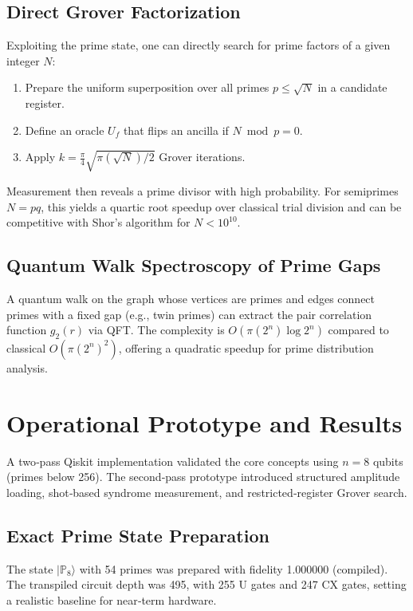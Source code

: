 \documentclass[12pt,a4paper]{article}
\begin{document}
\subsection{Direct Grover Factorization}
Exploiting the prime state, one can directly search for prime factors of a given integer \(N\):
\begin{enumerate}
    \item Prepare the uniform superposition over all primes \(p \le \sqrt{N}\) in a candidate register.
    \item Define an oracle \(U_f\) that flips an ancilla if \(N \bmod p = 0\).
    \item Apply \(k = \frac{\pi}{4}\sqrt{\pi(\sqrt{N})/2}\) Grover iterations.
\end{enumerate}
Measurement then reveals a prime divisor with high probability. For semiprimes \(N=pq\), this yields a quartic root speedup over classical trial division and can be competitive with Shor’s algorithm for \(N < 10^{10}\).

\subsection{Quantum Walk Spectroscopy of Prime Gaps}
A quantum walk on the graph whose vertices are primes and edges connect primes with a fixed gap (e.g., twin primes) can extract the pair correlation function \(g_2(r)\) via QFT. The complexity is \(O(\pi(2^n)\log 2^n)\) compared to classical \(O(\pi(2^n)^2)\), offering a quadratic speedup for prime distribution analysis.

\section{Operational Prototype and Results}

A two‑pass Qiskit implementation validated the core concepts using \(n=8\) qubits (primes below 256). The second‑pass prototype introduced structured amplitude loading, shot‑based syndrome measurement, and restricted‑register Grover search.

\subsection{Exact Prime State Preparation}
The state \(|\mathbb{P}_8\rangle\) with 54 primes was prepared with fidelity 1.000000 (compiled). The transpiled circuit depth was 495, with 255 U gates and 247 CX gates, setting a realistic baseline for near‑term hardware.
\end{document}
